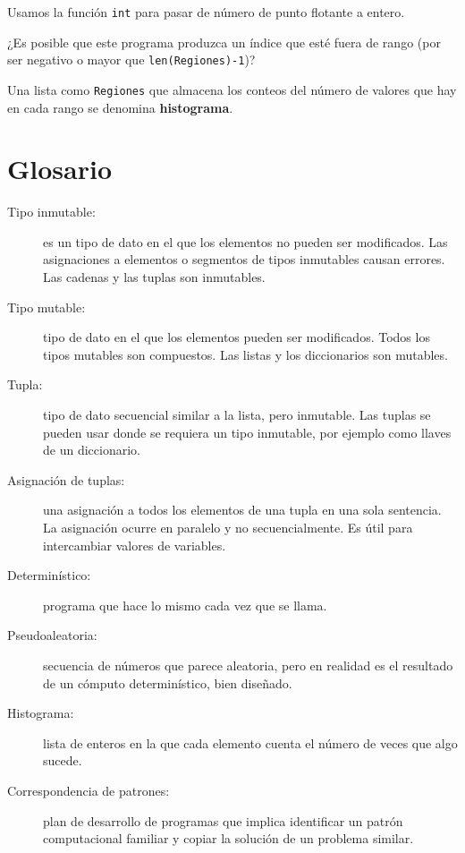 Usamos la función \texttt{int} para pasar de número de punto flotante
a entero.

¿Es posible que este programa produzca un índice que esté fuera de
rango (por ser negativo o mayor que \texttt{len(Regiones)-1})?

Una lista como \texttt{Regiones} que almacena los conteos del número
de valores que hay en cada rango se denomina \textbf{histograma}.

\section{Glosario}
\begin{description}
\item [{Tipo inmutable:}] es un tipo de dato en el que los elementos no
pueden ser modificados. Las asignaciones a elementos o segmentos de
tipos inmutables causan errores. Las cadenas y las tuplas son inmutables.
\item [{Tipo mutable:}] tipo de dato en el que los elementos pueden ser
modificados. Todos los tipos mutables son compuestos. Las listas y
los diccionarios son mutables.
\item [{Tupla:}] tipo de dato secuencial similar a la lista, pero inmutable.
Las tuplas se pueden usar donde se requiera un tipo inmutable, por
ejemplo como llaves de un diccionario.
\item [{Asignación de tuplas:}] una asignación a todos los elementos
de una tupla en una sola sentencia. La asignación ocurre en paralelo
y no secuencialmente. Es útil para intercambiar valores de variables.
\item [{Determinístico:}] programa que hace lo mismo cada vez que se llama.
\item [{Pseudoaleatoria:}] secuencia de números que parece aleatoria, pero
en realidad es el resultado de un cómputo determinístico, bien diseñado.
\item [{Histograma:}] lista de enteros en la que cada elemento cuenta el
número de veces que algo sucede.
\item [{Correspondencia de patrones:}] plan de desarrollo de programas
que implica identificar un patrón computacional familiar y copiar
la solución de un problema similar.

   
  
 
\end{description}

